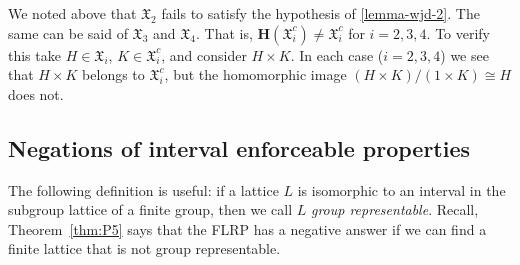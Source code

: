 \documentclass{gen-j-l}
\newcommand{\<}{\ensuremath{\langle}}
\renewcommand{\>}{\ensuremath{\rangle}}
\theoremstyle{plain}
\theoremstyle{definition}
\theoremstyle{remark}
\numberwithin{theorem}{section}
\numberwithin{claim}{section}
\numberwithin{equation}{section}
\numberwithin{conjecture}{section}
\newcommand{\defn}[1]{\emph{#1}}
\newcommand{\2}{\ensuremath{\mathbf{2}}}
\newcommand{\3}{\ensuremath{\mathbf{3}}}
\newcommand{\sG}{\ensuremath{\mathfrak{X}}}
\newcommand{\bH}{\ensuremath{\mathbf{H}}}
\begin{document}
We noted above that $\sG_2$ fails to satisfy the hypothesis of
\ref{lemma-wjd-2}. The same can be said of $\sG_3$ and $\sG_4$. That is, 
$\bH(\sG_i^c) \neq \sG_i^c$ for $i= 2, 3, 4$.  To verify this take $H\in
\sG_i$, $K\in \sG_i^c$, and consider $H\times K$.  In each case ($i=2, 3, 4$) we
see that $H\times K$ belongs to $\sG_i^c$, but the homomorphic image
$(H\times K)/(1\times K) \cong H$ does not. 

\subsection{Negations of interval enforceable properties}
\label{sec:negat-interv-enforc}
The following definition is useful: if a lattice $L$
is isomorphic to an interval in the subgroup lattice of a finite group, then we call
$L$ \defn{group representable}.  Recall, Theorem~\ref{thm:P5} says that the
\acs{FLRP} has a negative answer if we can find a finite lattice that is not group
representable. 
\end{document}

